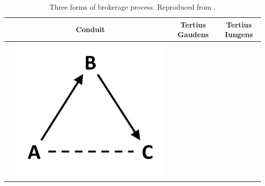 {{\begin{table}[]
\small
\centering
\caption{Three forms of brokerage process. Reproduced from \citet{obstfeld2014brokerage}.}
\label{brokerage}
\begin{tabularx}{\textwidth}{p{3.5cm}p{3.5cm}p{3.5cm}p{3.5cm}}
	\toprule
	& \multicolumn{1}{c}{Conduit} & \multicolumn{1}{c}{Tertius Gaudens} & \multicolumn{1}{c}{Tertius Iungens} \\ \midrule
	& \begin{minipage}{.2\textwidth} \centering \includegraphics[width=0.7\linewidth]{Images/CDT_brokerage} \end{minipage}  & \begin{minipage}{.2\textwidth} \centering \includegraphics[w
\end{tabularx}
\end{table}}}
